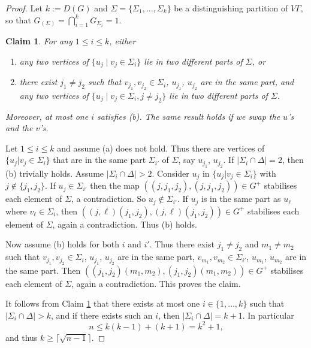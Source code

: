 \documentclass[11pt]{amsart}
\newtheorem{claim}{Claim}
\begin{document}
\begin{proof}

Let \(k:=D(G)\) and \(\Sigma=\{\Sigma_{1},\ldots, \Sigma_{k}\}\) be a distinguishing partition of \(V\Gamma\), so that \(G_{(\Sigma)}=\bigcap_{i=1}^{k}G_{\Sigma_{i}}=1\).

\begin{claim}\label{u_iatmosttwo}
For any \(1\leqslant i\leqslant  k\), either
\begin{enumerate}
\item[(a)]  any two vertices of \(\{u_j\mid v_j\in \Sigma_i\}\) lie in two different parts of \(\Sigma\), or 
\item[(b)]  there exist $j_1\neq j_2$ such that $v_{j_1},v_{j_2}\in \Sigma_i$, $u_{j_1}$, $u_{j_2}$ are in the same part, and any two vertices of \(\{u_j \mid v_j\in \Sigma_i, j\neq j_2\}\) lie in two different parts of \(\Sigma\). 
\end{enumerate}
Moreover, at most one $i$ satisfies (b). The same result holds if we swap the $u$'s and the $v$'s.
\end{claim}
Let \(1\leqslant i\leqslant  k\) and assume (a) does not hold. 
Thus there are vertices of \(\{u_j|v_j\in \Sigma_i\}\) that are in
the same part $\Sigma_{i'}$ of \(\Sigma\), say $u_{j_1}$, $u_{j_2}$.
If $|\Sigma_i\cap\Delta|=2$, then (b) trivially holds. Assume $|\Sigma_i\cap\Delta|>2$.
Consider $u_j$ in \(\{u_j|v_j\in \Sigma_i\}\) with $j\notin\{j_1,j_2\}$. 
If $u_j\in \Sigma_{i'}$ then the map $\left((j,j_1,j_2),(j,j_1,j_2)\right)\in G^+$ stabilises each element of \(\Sigma\), a contradiction. So $u_j\notin \Sigma_{i'}$.
If $u_j$ is in the same part as $u_\ell$ where $v_\ell\in \Sigma_i$, then  $\left((j,\ell)(j_1,j_2),(j,\ell)(j_1,j_2)\right)\in G^+$ stabilises each element of \(\Sigma\), again a contradiction. Thus (b) holds.

Now assume (b) holds for both $i$ and $i'$. Thus there exist $j_1 \neq j_2$ and $m_1 \neq m_2$ such that $v_{j_1},v_{j_2}\in \Sigma_i$, $u_{j_1}$, $u_{j_2}$ are in the same part, $v_{m_1},v_{m_2}\in \Sigma_{i'}$, $u_{m_1}$, $u_{m_2}$ are in the same part.
Then $\left(({j_1},{j_2})({m_1},{m_2}),({j_1},{j_2})({m_1},{m_2})\right)\in G^+$ stabilises each element of \(\Sigma\), again a contradiction. This proves the claim.

It follows from Claim \ref{u_iatmosttwo} that there exists at most one $i \in \{1, \dots, k\}$ such that $|\Sigma_i \cap \Delta| >k$, and if there exists such an $i$, then $|\Sigma_i \cap \Delta| = k+1$. 
In particular
\[
n \leqslant k (k - 1) + (k + 1) = k^2 + 1,
\]
and thus $k \geqslant \lceil \sqrt{n - 1} \rceil$.


\end{proof}
\end{document}
